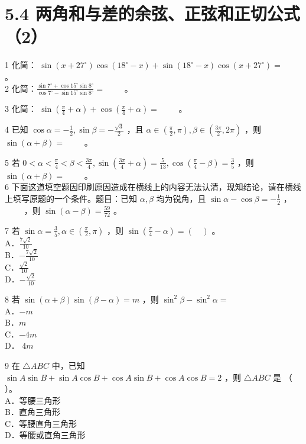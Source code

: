 \documentclass[10pt]{article}
\begin{document}
\section*{5.4 两角和与差的余弦、正弦和正切公式（2）}
1 化简： \(\sin \left(x+27^{\circ}\right) \cos \left(18^{\circ}-x\right)+\sin \left(18^{\circ}-x\right) \cos \left(x+27^{\circ}\right)=\) \(\qquad\)。\\
2 化简：\(\frac{\sin 7^{\circ}+\cos 15^{\circ} \sin 8^{\circ}}{\cos 7^{\circ}-\sin 15^{\circ} \sin 8^{\circ}}=\) \(\qquad\)。

3 化简： \(\sin \left(\frac{\pi}{4}+\alpha\right)+\cos \left(\frac{\pi}{4}+\alpha\right)=\) \(\qquad\)。

4 已知 \(\cos \alpha=-\frac{1}{2}, \sin \beta=-\frac{\sqrt{3}}{2}\) ，且 \(\alpha \in\left(\frac{\pi}{2}, \pi\right), \beta \in\left(\frac{3 \pi}{2}, 2 \pi\right)\) ，则 \(\sin (\alpha+\beta)=\) \(\qquad\)。

5 若 \(0<\alpha<\frac{\pi}{4}<\beta<\frac{3 \pi}{4}, \sin \left(\frac{3 \pi}{4}+\alpha\right)=\frac{5}{13}, \cos \left(\frac{\pi}{4}-\beta\right)=\frac{3}{5}\) ，则 \(\sin (\alpha+\beta)=\) \(\qquad\)。\\
6 下面这道填空题因印刷原因造成在横线上的内容无法认清，现知结论，请在横线上填写原题的一个条件。题目：已知 \(\alpha, \beta\) 均为锐角，且 \(\sin \alpha-\cos \beta=-\frac{1}{2}\) ， \(\qquad\) ，则 \(\sin (\alpha-\beta)=\frac{59}{72}\) 。

7 若 \(\sin \alpha=\frac{3}{5}, \alpha \in\left(\frac{\pi}{2}, \pi\right)\) ，则 \(\sin \left(\frac{\pi}{4}-\alpha\right)=(\quad)\) 。\\
A．\(\frac{7 \sqrt{2}}{10}\)\\
B．\(-\frac{7 \sqrt{2}}{10}\)\\
C．\(\frac{\sqrt{2}}{10}\)\\
D．\(-\frac{\sqrt{2}}{10}\)

8 若 \(\sin (\alpha+\beta) \sin (\beta-\alpha)=m\) ，则 \(\sin ^{2} \beta-\sin ^{2} \alpha=\)\\
A．\(-m\)\\
B．\(m\)\\
C．\(-4 m\)\\
D． \(4 m\)

9 在 \(\triangle A B C\) 中，已知 \(\sin A \sin B+\sin A \cos B+\cos A \sin B+\cos A \cos B=2\) ，则 \(\triangle A B C\) 是 （ ）。\\
A．等腰三角形\\
B．直角三角形\\
C．等腰直角三角形\\
D．等腰或直角三角形
\end{document}
